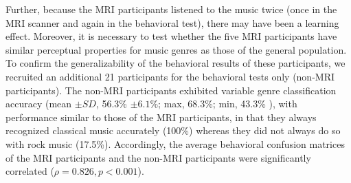 \documentclass[sn-mathphys]{sn-jnl}%
\theoremstyle{thmstyleone}%
\theoremstyle{thmstyletwo}%
\theoremstyle{thmstylethree}%
\begin{document}
Further, because the MRI participants listened to the music twice (once in the MRI scanner and again in the behavioral test), there may have been a learning effect.
Moreover, it is necessary to test whether the five MRI participants have similar perceptual properties for music genres as those of the general population.
To confirm the generalizability of the behavioral results of these participants, we recruited an additional 21 participants for the behavioral tests only (non-MRI participants).
The non-MRI participants exhibited variable genre classification accuracy (mean $\pm SD $, 56.3\% $ \pm 6.1\% $; max, 68.3\%; min, 43.3\% ), with performance similar to those of the MRI participants, in that they always recognized classical music accurately (100\%) whereas they did not always do so with rock music (17.5\%). 
Accordingly, the average behavioral confusion matrices of the MRI participants and the non-MRI participants were significantly correlated ($ \rho = 0.826, p < 0.001 $).






\end{document}
